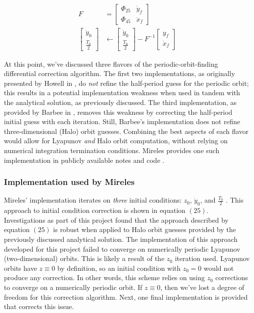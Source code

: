 \documentclass[conf]{new-aiaa}
\begin{document}
\begin{multicols*}{2}
\begin{equation}
    \begin{aligned}
        F &= \begin{bmatrix} \Phi_{25} & \dot{y}_f \\ \Phi_{45} & \ddot{x}_f \end{bmatrix} \\
        \begin{bmatrix} \dot{y}_0 \\ \frac{T_0}{2} \end{bmatrix} & \leftarrow 
        \begin{bmatrix} \dot{y}_0 \\ \frac{T_0}{2} \end{bmatrix} - F^{-1} \begin{bmatrix} y_f \\ \dot{x}_f \end{bmatrix}
    \end{aligned}
\end{equation}

At this point, we've discussed three flavors of the periodic-orbit-finding 
differential correction algorithm. The first two implementations, 
as originally presented by Howell in \cite{howell1984three}, 
do \textit{not} refine the half-period guess for the periodic orbit; this 
results in a potential implementation weakness when used in tandem with 
the analytical solution, as previously discussed. The third implementation,
as provided by Barbee in \cite{barbeeCode}, removes this weakness by 
correcting the half-period initial guess with each iteration. Still, Barbee's
implementation does not refine three-dimensional (Halo) orbit guesses.
Combining the best aspects of each flavor would allow for Lyapunov \textit{and}
Halo orbit computation, without relying on numerical integration
termination conditions. Mireles provides one such implementation in 
publicly available notes and code \cite{mirelesNotes} \cite{mirelesCode}.

\subsubsection*{Implementation used by Mireles}
Mireles' implementation iterates on \textit{three} initial conditions:
$z_0$, $\dot{y}_0$, and $\frac{T_0}{2}$ \cite{mirelesNotes} \cite{mirelesCode}.
This approach to initial condition correction is shown in equation $(25)$.
Investigations as part of this project found that the approach described by 
equation $(25)$ is robust when applied to Halo orbit guesses provided 
by the previously discussed analytical solution. The implementation of this 
approach developed for this project failed to converge on numerically 
periodic Lyapunov (two-dimensional) orbits. This is likely a result 
of the $z_0$ iteration used. Lyapunov orbits have $z \equiv 0$ by definition, 
so an initial condition with $z_0 = 0$ would not produce any correction.
In other words, this scheme relies on using $z_0$ corrections to 
converge on a numerically periodic orbit. If $z \equiv 0$, then we've lost 
a degree of freedom for this correction algorithm. Next, one final 
implementation is provided that corrects this issue.


\end{multicols*}
\end{document}
